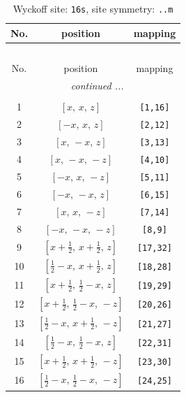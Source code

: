 \documentclass[fleqn,8pt]{jsarticle}
\begin{document}
\renewcommand{\arraystretch}{1.2}
\begin{longtable}{ccc}
\caption{Wyckoff site: {\tt 16s}, site symmetry: {\tt ..m}}
 \\
 \hline \hline
No. & position & mapping \\ \hline \endfirsthead

\multicolumn{2}{l}{\tablename\ \thetable{}} \\
 \hline \hline
No. & position & mapping \\ \hline \endhead

 \hline \hline
\multicolumn{2}{r}{\footnotesize\it continued ...} \\ \endfoot

 \hline \hline
\multicolumn{2}{r}{} \\ \endlastfoot

1 & $\left[ x,\, x,\, z \right]$ & {\tt [1,16]} \\ \hline
2 & $\left[ - x,\, x,\, z \right]$ & {\tt [2,12]} \\ \hline
3 & $\left[ x,\, - x,\, z \right]$ & {\tt [3,13]} \\ \hline
4 & $\left[ x,\, - x,\, - z \right]$ & {\tt [4,10]} \\ \hline
5 & $\left[ - x,\, x,\, - z \right]$ & {\tt [5,11]} \\ \hline
6 & $\left[ - x,\, - x,\, z \right]$ & {\tt [6,15]} \\ \hline
7 & $\left[ x,\, x,\, - z \right]$ & {\tt [7,14]} \\ \hline
8 & $\left[ - x,\, - x,\, - z \right]$ & {\tt [8,9]} \\ \hline
9 & $\left[ x + \frac{1}{2},\, x + \frac{1}{2},\, z \right]$ & {\tt [17,32]} \\ \hline
10 & $\left[ \frac{1}{2} - x,\, x + \frac{1}{2},\, z \right]$ & {\tt [18,28]} \\ \hline
11 & $\left[ x + \frac{1}{2},\, \frac{1}{2} - x,\, z \right]$ & {\tt [19,29]} \\ \hline
12 & $\left[ x + \frac{1}{2},\, \frac{1}{2} - x,\, - z \right]$ & {\tt [20,26]} \\ \hline
13 & $\left[ \frac{1}{2} - x,\, x + \frac{1}{2},\, - z \right]$ & {\tt [21,27]} \\ \hline
14 & $\left[ \frac{1}{2} - x,\, \frac{1}{2} - x,\, z \right]$ & {\tt [22,31]} \\ \hline
15 & $\left[ x + \frac{1}{2},\, x + \frac{1}{2},\, - z \right]$ & {\tt [23,30]} \\ \hline
16 & $\left[ \frac{1}{2} - x,\, \frac{1}{2} - x,\, - z \right]$ & {\tt [24,25]} \\
\end{longtable}
\end{document}
